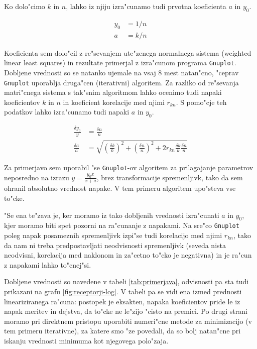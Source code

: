 \documentclass[a4paper,10pt]{article}
\begin{document}
Ko dolo"cimo $k$ in $n$, lahko iz njiju izra"cunamo tudi prvotna koeficienta $a$ in $y_0$. 

\begin{align}
 y_0 &= 1/n \\
 a &= k/n
\end{align}

Koeficienta sem dolo"cil z re"sevanjem ute"zenega normalnega sistema (weighted linear least squares) in rezultate primerjal z izra"cunom programa \texttt{Gnuplot}. Dobljene vrednosti so se natanko ujemale na vsaj 8 mest natan"cno, "ceprav \texttt{Gnuplot} uporablja druga"cen (iterativni) algoritem. Za razliko od re"sevanja matri"cnega sistema s tak"snim algoritmom lahko ocenimo tudi napaki koeficientov $k$ in $n$ in koeficient korelacije med njimi $r_{kn}$. S pomo"cje teh podatkov lahko izra"cunamo tudi napaki $a$ in $y_0$. 

\begin{align}
  \frac{\delta y_0}{y} &= \frac{\delta n}{n} \\
  \frac{\delta a}{a} &= \sqrt{ \left( \frac{\delta k}{k} \right)^2 + \left(\frac{\delta n}{n} \right)^2 + 2r_{kn} \frac{\delta k}{k}\frac{\delta n}{n}}
\end{align}

Za primerjavo sem uporabil "se \texttt{Gnuplot}-ov algoritem za prilagajanje parametrov neposredno na izrazu $y = \frac{y_0 x}{x+a}$, brez transformacije spremenljivk, tako da sem ohranil absolutno vrednost napake. V tem primeru algoritem upo"steva vse to"cke. 

"Se ena te"zava je, ker moramo iz tako dobljenih vrednosti izra"cunati $a$ in $y_0$, kjer moramo biti spet pozorni na ra"cunanje z napakami. Na sre"co \texttt{Gnuplot} poleg napak posameznih spremenljivk izpi"se tudi korelacijo med njimi $r_{kn}$, tako da nam ni treba predpostavljati neodvisnosti spremenljivk (seveda nista neodvisni, korelacija med naklonom in za"cetno to"cko je negativna) in je ra"cun z napakami lahko to"cnej"si. 

Dobljene vrednosti so navedene v tabeli \ref{tab:primerjava}, odvisnosti pa sta tudi prikazani na grafu \ref{fig:receptorji-log}. V tabeli pa se vidi ena izmed prednosti lineariziranega ra"cuna: postopek je eksakten, napaka koeficientov pride le iz napak meritev in dejstva, da to"cke ne le"zijo "cisto na premici. Po drugi strani moramo pri direktnem pristopu uporabiti numeri"cne metode za minimizacijo (v tem primeru iterativne), za katere smo "ze povedali, da so bolj natan"cne pri iskanju vrednosti minimuma kot njegovega polo"zaja. 
\end{document}
